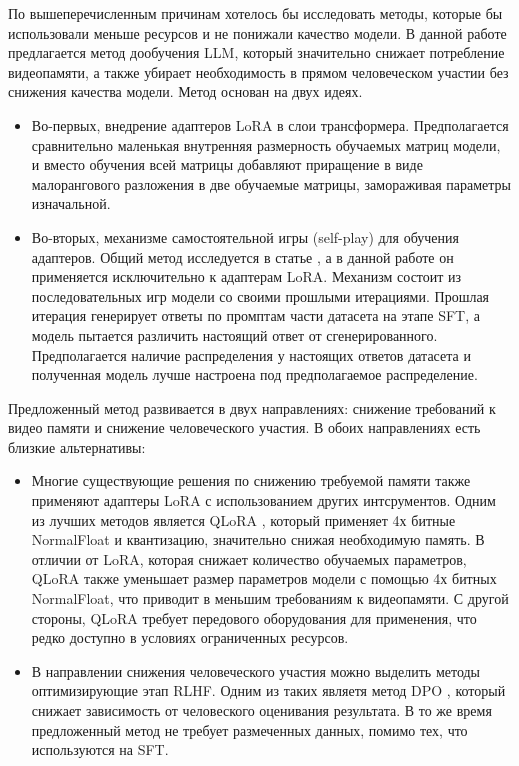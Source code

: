 \documentclass[12pt, twoside]{article}
\begin{document}
По вышеперечисленным причинам хотелось бы исследовать методы, которые бы использовали меньше ресурсов и не понижали качество модели. В данной работе предлагается метод дообучения LLM, который значительно снижает потребление видеопамяти, а также убирает необходимость в прямом человеческом участии без снижения качества модели. Метод основан на двух идеях. 

\begin{itemize}
  \item Во-первых, внедрение адаптеров LoRA в слои трансформера. Предполагается сравнительно маленькая внутренняя размерность обучаемых матриц модели, и вместо обучения всей матрицы добавляют приращение в виде малорангового разложения в две обучаемые матрицы, замораживая параметры изначальной. 
  
  \vspace{8}
   
  \item Во-вторых, механизме самостоятельной игры (self-play) для обучения адаптеров. Общий метод исследуется в статье \parencite{Chen2024a}, а  в данной работе он применяется исключительно к адаптерам LoRA. Механизм состоит из последовательных игр модели со своими прошлыми итерациями. Прошлая итерация генерирует ответы по промптам части датасета на этапе SFT, а модель пытается различить настоящий ответ от сгенерированного. Предполагается наличие распределения у настоящих ответов датасета и полученная модель лучше настроена под предполагаемое распределение.
\end{itemize}

Предложенный метод развивается в двух направлениях: снижение требований к видео памяти и снижение человеческого участия. В обоих направлениях есть близкие альтернативы:

\begin{itemize}
  \item Многие существующие решения по снижению требуемой памяти также применяют адаптеры LoRA с использованием других интсрументов. Одним из лучших методов является QLoRA \parencite{Dettmers2023}, который применяет 4х битные NormalFloat и квантизацию, значительно снижая необходимую память. В отличии от LoRA, которая снижает количество обучаемых параметров, QLoRA также уменьшает размер параметров модели с помощью 4х битных NormalFloat, что приводит в меньшим требованиям к видеопамяти. С другой стороны, QLoRA требует передового оборудования для применения, что редко доступно в условиях ограниченных ресурсов. 

  \vspace{8}
  
  \item В направлении снижения человеческого участия можно выделить методы оптимизирующие этап RLHF. Одним из таких являетя метод DPO \parencite{Rafailov2023a}, который снижает зависимость от человеского оценивания результата. В то же время предложенный метод не требует размеченных данных, помимо тех, что используются на SFT.
\end{itemize}
\end{document}
